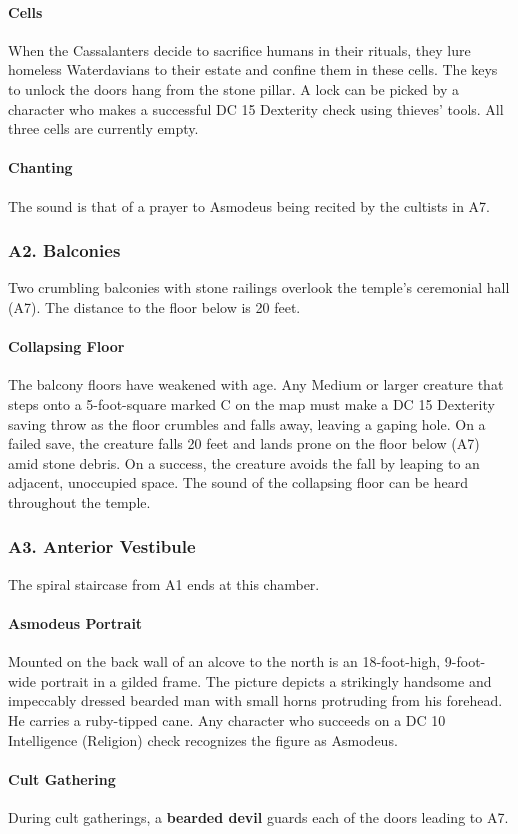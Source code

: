 \documentclass[10pt,a4paper,twoside,twocolumn,openany,nodeprecatedcode]{dndbook}
\begin{document}
\paragraph{Cells}
When the Cassalanters decide to sacrifice humans in their rituals, they lure homeless Waterdavians to their estate and confine them in these cells. The keys to unlock the doors hang from the stone pillar. A lock can be picked by a character who makes a successful DC 15 Dexterity check using thieves' tools. All three cells are currently empty.
\paragraph{Chanting}
The sound is that of a prayer to Asmodeus being recited by the cultists in A7.
\subsubsection{A2. Balconies}
Two crumbling balconies with stone railings overlook the temple's ceremonial hall (A7). The distance to the floor below is 20 feet.
\paragraph{Collapsing Floor}
The balcony floors have weakened with age. Any Medium or larger creature that steps onto a 5-foot-square marked C on the map must make a DC 15 Dexterity saving throw as the floor crumbles and falls away, leaving a gaping hole. On a failed save, the creature falls 20 feet and lands prone on the floor below (A7) amid stone debris. On a success, the creature avoids the fall by leaping to an adjacent, unoccupied space. The sound of the collapsing floor can be heard throughout the temple.
\subsubsection{A3. Anterior Vestibule}
The spiral staircase from A1 ends at this chamber.
\paragraph{Asmodeus Portrait}
Mounted on the back wall of an alcove to the north is an 18-foot-high, 9-foot-wide portrait in a gilded frame. The picture depicts a strikingly handsome and impeccably dressed bearded man with small horns protruding from his forehead. He carries a ruby-tipped cane. Any character who succeeds on a DC 10 Intelligence (Religion) check recognizes the figure as Asmodeus.
\paragraph{Cult Gathering}
During cult gatherings, a \textbf{bearded devil} guards each of the doors leading to A7.
\end{document}
